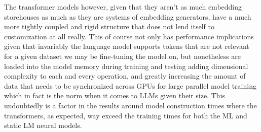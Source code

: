 \documentclass[final]{clv2025}
\begin{document}
The transformer models however, given that they aren’t as much embedding storehouses as much as they are systems of embedding generators, have a much more tightly coupled and rigid structure that does not lend itself to customization at all really. This of course not only has performance implications given that invariably the language model supports tokens that are not relevant for a given dataset we may be fine-tuning the model on, but nonetheless are loaded into the model memory during training and testing adding dimensional complexity to each and every operation, and greatly increasing the amount of data that needs to be synchronized across GPUs for large parallel model training which in fact is the norm when it comes to LLMs given their size. This undoubtedly is a factor in the results around model construction times where the transformers, as expected, way exceed the training times for both the ML and static LM neural models.
\end{document}
